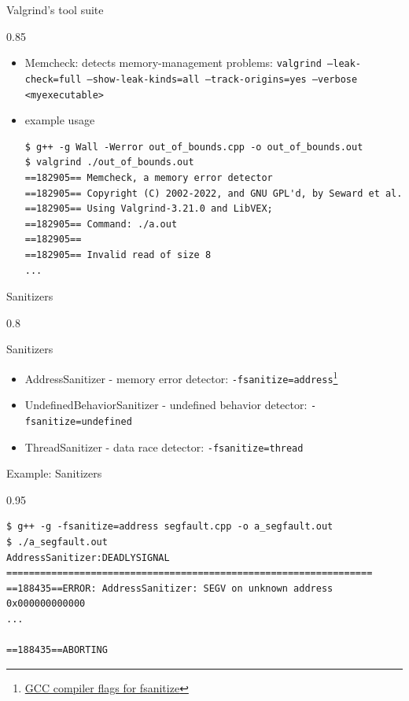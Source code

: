 \documentclass[aspectratio=1610]{beamer}
\newenvironment{centeredblock}[2][0.8\textwidth]
{ %
	\begin{center}
		\begin{varwidth}{#1} %
			\begin{block}{#2}
				\centering
			}
			{ %
			\end{block}
		\end{varwidth}
	\end{center}
}
\begin{document}
	\begin{frame}[fragile]{Valgrind's tool suite}
		\begin{centeredblock}[0.85 \textwidth]{}
			\begin{itemize}
				\item Memcheck: detects memory-management problems: \newline 
					\texttt{valgrind --leak-check=full --show-leak-kinds=all --track-origins=yes --verbose <myexecutable>}
					\item example usage
\begin{verbatim}
$ g++ -g Wall -Werror out_of_bounds.cpp -o out_of_bounds.out
$ valgrind ./out_of_bounds.out
==182905== Memcheck, a memory error detector
==182905== Copyright (C) 2002-2022, and GNU GPL'd, by Seward et al.
==182905== Using Valgrind-3.21.0 and LibVEX;
==182905== Command: ./a.out
==182905== 
==182905== Invalid read of size 8
...
\end{verbatim}
			\end{itemize}
		\end{centeredblock}
	\end{frame}
	
	\begin{frame}[fragile]{Sanitizers}
		\begin{centeredblock}{Sanitizers}
			\begin{itemize}
				\item AddressSanitizer - memory error detector: \texttt{-fsanitize=address}\footnote[frame]{\href{https://gcc.gnu.org/onlinedocs/gcc/Instrumentation-Options.html#index-fsanitize_003daddress}{GCC compiler flags for fsanitize}} 
				\item UndefinedBehaviorSanitizer - undefined behavior detector: \texttt{-fsanitize=undefined}
				\item ThreadSanitizer - data race detector: \texttt{-fsanitize=thread}
			\end{itemize}
		\end{centeredblock}
	\end{frame}
	
	\begin{frame}[fragile]{Example: Sanitizers}
		\begin{centeredblock}[0.95 \textwidth]{}
			\begin{verbatim}
$ g++ -g -fsanitize=address segfault.cpp -o a_segfault.out
$ ./a_segfault.out
AddressSanitizer:DEADLYSIGNAL
=================================================================
==188435==ERROR: AddressSanitizer: SEGV on unknown address 0x000000000000
...

==188435==ABORTING
			\end{verbatim}
		\end{centeredblock}
	\end{frame}
	
\end{document}
